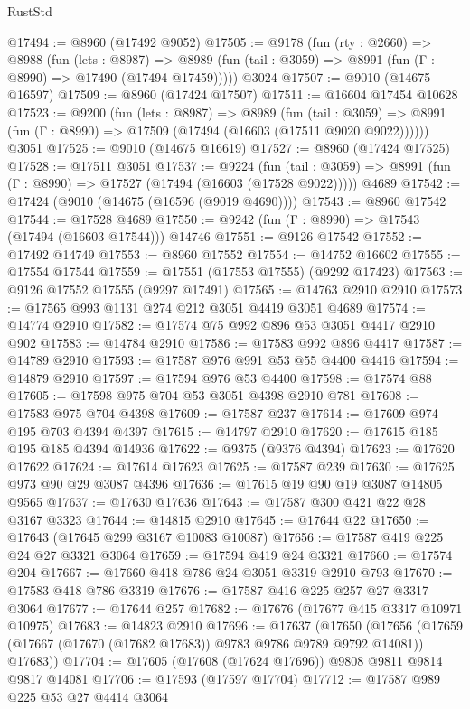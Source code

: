 \begin{lexlean}{RustStd}
\begin{coremodule}
@17494 := @8960 (@17492 @9052)
@17505 := @9178
    (fun (rty : @2660) =>
    @8988
      (fun (lets : @8987) =>
      @8989 (fun (tail : @3059) => @8991 (fun (Γ : @8990) => @17490 (@17494 @17459)))))
    @3024
@17507 := @9010 (@14675 @16597)
@17509 := @8960 (@17424 @17507)
@17511 := @16604 @17454 @10628
@17523 := @9200
    (fun (lets : @8987) =>
    @8989
      (fun (tail : @3059) =>
      @8991 (fun (Γ : @8990) => @17509 (@17494 (@16603 (@17511 @9020 @9022))))))
    @3051
@17525 := @9010 (@14675 @16619)
@17527 := @8960 (@17424 @17525)
@17528 := @17511 @3051
@17537 := @9224
    (fun (tail : @3059) => @8991 (fun (Γ : @8990) => @17527 (@17494 (@16603 (@17528 @9022)))))
    @4689
@17542 := @17424 (@9010 (@14675 (@16596 (@9019 @4690))))
@17543 := @8960 @17542
@17544 := @17528 @4689
@17550 := @9242 (fun (Γ : @8990) => @17543 (@17494 (@16603 @17544))) @14746
@17551 := @9126 @17542
@17552 := @17492 @14749
@17553 := @8960 @17552
@17554 := @14752 @16602
@17555 := @17554 @17544
@17559 := @17551 (@17553 @17555) (@9292 @17423)
@17563 := @9126 @17552 @17555 (@9297 @17491)
@17565 := @14763 @2910 @2910
@17573 := @17565 @993 @1131 @274 @212 @3051 @4419 @3051 @4689
@17574 := @14774 @2910
@17582 := @17574 @75 @992 @896 @53 @3051 @4417 @2910 @902
@17583 := @14784 @2910
@17586 := @17583 @992 @896 @4417
@17587 := @14789 @2910
@17593 := @17587 @976 @991 @53 @55 @4400 @4416
@17594 := @14879 @2910
@17597 := @17594 @976 @53 @4400
@17598 := @17574 @88
@17605 := @17598 @975 @704 @53 @3051 @4398 @2910 @781
@17608 := @17583 @975 @704 @4398
@17609 := @17587 @237
@17614 := @17609 @974 @195 @703 @4394 @4397
@17615 := @14797 @2910
@17620 := @17615 @185 @195 @185 @4394 @14936
@17622 := @9375 (@9376 @4394)
@17623 := @17620 @17622
@17624 := @17614 @17623
@17625 := @17587 @239
@17630 := @17625 @973 @90 @29 @3087 @4396
@17636 := @17615 @19 @90 @19 @3087 @14805 @9565
@17637 := @17630 @17636
@17643 := @17587 @300 @421 @22 @28 @3167 @3323
@17644 := @14815 @2910
@17645 := @17644 @22
@17650 := @17643 (@17645 @299 @3167 @10083 @10087)
@17656 := @17587 @419 @225 @24 @27 @3321 @3064
@17659 := @17594 @419 @24 @3321
@17660 := @17574 @204
@17667 := @17660 @418 @786 @24 @3051 @3319 @2910 @793
@17670 := @17583 @418 @786 @3319
@17676 := @17587 @416 @225 @257 @27 @3317 @3064
@17677 := @17644 @257
@17682 := @17676 (@17677 @415 @3317 @10971 @10975)
@17683 := @14823 @2910
@17696 := @17637
    (@17650
      (@17656 (@17659 (@17667 (@17670 (@17682 @17683)) @9783 @9786 @9789 @9792 @14081)) @17683))
@17704 := @17605 (@17608 (@17624 @17696)) @9808 @9811 @9814 @9817 @14081
@17706 := @17593 (@17597 @17704)
@17712 := @17587 @989 @225 @53 @27 @4414 @3064

\end{coremodule}
\end{lexlean}
